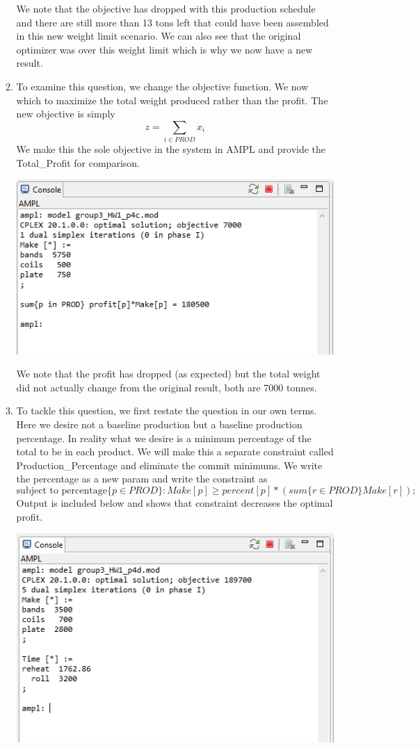 \documentclass[11pt]{article}
\begin{document}
\begin{enumerate}
\begin{enumerate}
We note that the objective has dropped with this production schedule and there are still more than 13 tons left that could have been assembled in this new weight limit scenario.  We can also see that the original optimizer was over this weight limit which is why we now have a new result.

\item To examine this question, we change the objective function.  We now which to maximize the total weight produced rather than the profit.  The new objective is simply
\[
z = \sum_{i\in PROD} x_i
\]
We make this the sole objective in the system in AMPL and provide the Total\_Profit for comparison.

\includegraphics{outputp4c.png}

We note that the profit has dropped (as expected) but the total weight did not actually change from the original result, both are 7000 tonnes.

\item To tackle this question, we first restate the question in our own terms.  Here we desire not a baseline production but a baseline production percentage.  In reality what we desire is a minimum percentage of the total to be in each product.  We will make this a separate constraint called Production\_Percentage and eliminate the commit minimums.  We write the percentage as a new param and write the constraint as 
\[
\text{subject to percentage} \{p \in PROD\}: Make[p] \geq percent[p]*\left(sum \{r \in PROD\} Make[r]\right);
\]
Output is included below and shows that constraint decreases the optimal profit.

\includegraphics{outputp4d.png}


\end{enumerate}
\end{enumerate}
\end{document}
